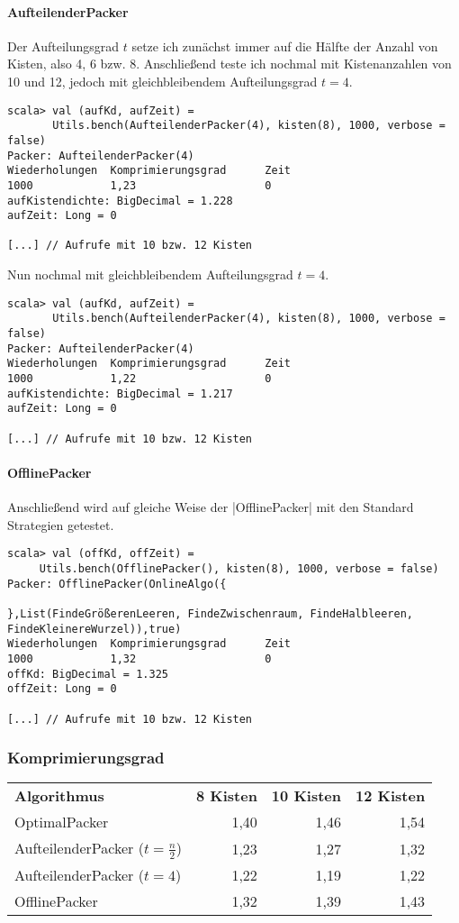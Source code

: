 \paragraph{AufteilenderPacker}
Der Aufteilungsgrad $t$ setze ich zunächst immer auf die Hälfte der Anzahl von Kisten, also 4, 6 bzw. 8.
Anschließend teste ich nochmal mit Kistenanzahlen von 10 und 12, jedoch mit gleichbleibendem Aufteilungsgrad $t = 4$.

\begin{lstlisting}
scala> val (aufKd, aufZeit) =
       Utils.bench(AufteilenderPacker(4), kisten(8), 1000, verbose = false)
Packer: AufteilenderPacker(4)
Wiederholungen  Komprimierungsgrad      Zeit
1000            1,23                    0
aufKistendichte: BigDecimal = 1.228
aufZeit: Long = 0

[...] // Aufrufe mit 10 bzw. 12 Kisten
\end{lstlisting}
Nun nochmal mit gleichbleibendem Aufteilungsgrad $t=4$.

\begin{lstlisting}
scala> val (aufKd, aufZeit) =
       Utils.bench(AufteilenderPacker(4), kisten(8), 1000, verbose = false) 
Packer: AufteilenderPacker(4)
Wiederholungen  Komprimierungsgrad      Zeit
1000            1,22                    0
aufKistendichte: BigDecimal = 1.217
aufZeit: Long = 0

[...] // Aufrufe mit 10 bzw. 12 Kisten
\end{lstlisting}
\paragraph{OfflinePacker}
Anschließend wird auf gleiche Weise der |OfflinePacker| mit den Standard Strategien getestet.
\begin{lstlisting}
scala> val (offKd, offZeit) =
	 Utils.bench(OfflinePacker(), kisten(8), 1000, verbose = false)
Packer: OfflinePacker(OnlineAlgo({

},List(FindeGrößerenLeeren, FindeZwischenraum, FindeHalbleeren, FindeKleinereWurzel)),true)
Wiederholungen  Komprimierungsgrad      Zeit
1000            1,32                    0
offKd: BigDecimal = 1.325
offZeit: Long = 0

[...] // Aufrufe mit 10 bzw. 12 Kisten
\end{lstlisting}
\subsubsection*{Komprimierungsgrad}
\begin{tabular}{lrrr}
\textbf{Algorithmus} 	& \textbf{8 Kisten} 	& \textbf{10 Kisten} 	& \textbf{12 Kisten} 	\\
 OptimalPacker       	& 1,40               	& 1,46              	& 1,54               	\\
 AufteilenderPacker ($t=\frac{n}{2}$)  	& 1,23	& 1,27			& 1,32			\\
 AufteilenderPacker ($t=4$)	 	& 1,22	& 1,19			& 1,22			\\
 OfflinePacker		& 1,32			& 1,39			& 1,43			\\
\end{tabular}\\

